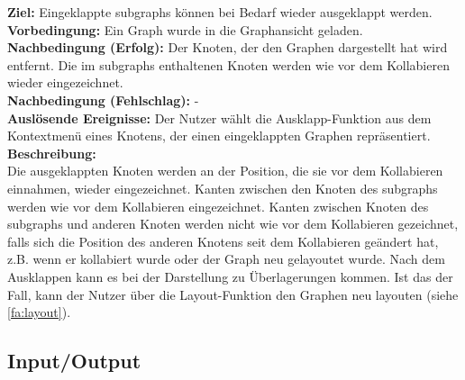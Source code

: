 \label{fa:ausklappen}
\textbf{Ziel:} Eingeklappte \glspl{subgraph} können bei Bedarf wieder ausgeklappt werden.\\
\textbf{Vorbedingung:} Ein Graph wurde in die Graphansicht geladen.\\
\textbf{Nachbedingung (Erfolg):} Der Knoten, der den Graphen dargestellt hat wird entfernt. Die im \glspl{subgraph} enthaltenen Knoten werden wie vor dem Kollabieren wieder eingezeichnet.\\
\textbf{Nachbedingung (Fehlschlag):} -\\
\textbf{Auslösende Ereignisse:} Der Nutzer wählt die Ausklapp-Funktion aus dem Kontextmenü eines Knotens, der einen eingeklappten Graphen repräsentiert.\\
\textbf{Beschreibung:}\\
Die ausgeklappten Knoten werden an der Position, die sie vor dem Kollabieren einnahmen,  wieder eingezeichnet.
Kanten zwischen den Knoten des \glspl{subgraph} werden wie vor dem Kollabieren eingezeichnet.
Kanten zwischen Knoten des \glspl{subgraph} und anderen Knoten werden nicht wie vor dem Kollabieren gezeichnet,
falls sich die Position des anderen Knotens seit dem Kollabieren geändert hat, z.B. wenn er kollabiert wurde oder der Graph neu gelayoutet wurde.
Nach dem Ausklappen kann es bei der Darstellung zu Überlagerungen kommen.
Ist das der Fall, kann der Nutzer über die Layout-Funktion den Graphen neu layouten (siehe \ref{fa:layout}).

\subsection{Input/Output}
\setcounter{fanr}{100}

